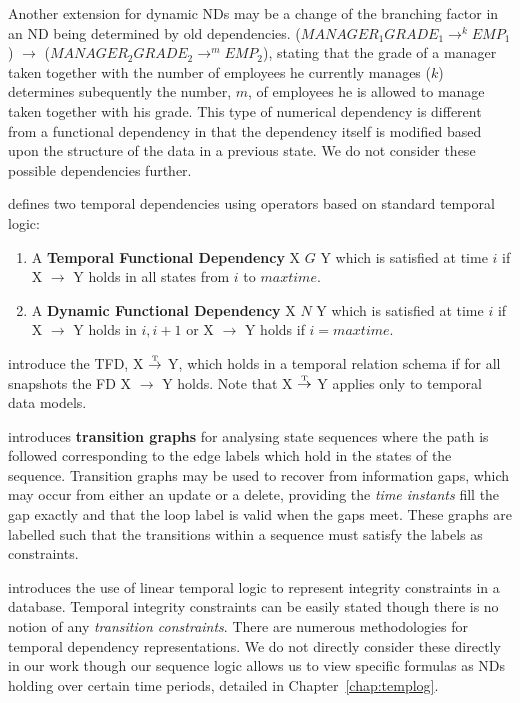 \medskip

Another extension for dynamic NDs may be a change of the branching
factor in an ND being determined by old dependencies.
($MANAGER_1 GRADE_1 \to^k EMP_1$) $\to$  ($MANAGER_2 GRADE_2 \to^m EMP_2$),
stating that the grade of a manager taken together with the number of employees
he currently manages ($k$) determines subequently the number, $m$, of 
employees he is allowed to manage taken together with his grade. 
This type of numerical dependency is 
different from a functional dependency in that the dependency itself is
modified based upon the structure of the data in a previous state. We
do not consider these possible dependencies further.

 \cite{wij95} defines two temporal dependencies using operators based
 on standard temporal logic:
\begin{enumerate}
\item A {\bf Temporal Functional Dependency} X $G$ Y which is satisfied
at time $i$ if X $\to$ Y holds in all states from $i$ to $maxtime$.
\item A {\bf Dynamic Functional Dependency} X $N$ Y which is satisfied
at time $i$ if X $\to$ Y holds in $i, i + 1$ or X $\to$ Y holds if $i = maxtime$.
\end{enumerate}

\cite{jss96} introduce the TFD, X $\stackrel{\mbox{\tiny{T}}}{\to}$ Y, which
holds in a temporal relation schema if for all snapshots the FD X $\to$ Y
holds. Note that X $\stackrel{\mbox{\tiny{T}}}{\to}$ Y applies only to
temporal data models.

\cite{gl95} introduces {\bf transition graphs} for analysing state sequences
where the path is followed corresponding to the edge labels which
hold in the states of the sequence. Transition graphs may be used to 
recover from information gaps, which may occur from either an update or
a delete, providing the {\em time instants} fill the gap exactly and that
the loop label is valid when the gaps meet. These graphs are labelled
such that the transitions within a sequence must satisfy the labels as 
constraints.


\cite{cho94} introduces the use of linear temporal logic to represent
integrity constraints in a database. Temporal 
integrity constraints can be easily stated though there is no notion of
any {\em transition constraints}. There are numerous methodologies for
temporal dependency representations. We do not directly consider these
directly in our work though our sequence logic allows us to view
specific formulas as NDs holding over certain time periods, detailed
in Chapter~\ref{chap:templog}.


